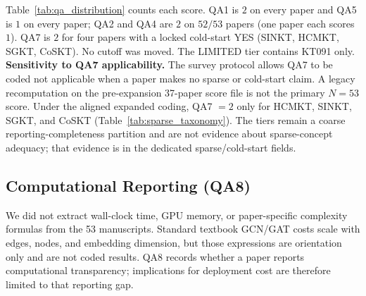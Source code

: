 \documentclass[lettersize,journal]{IEEEtran}
\begin{document}
Table~\ref{tab:qa_distribution} counts each score. QA1 is $2$ on every paper and QA5 is $1$ on every paper; QA2 and QA4 are $2$ on $52/53$ papers (one paper each scores $1$). QA7 is $2$ for four papers with a locked cold-start YES (SINKT, HCMKT, SGKT, CoSKT). No cutoff was moved. The LIMITED tier contains KT091 only.
\textbf{Sensitivity to QA7 applicability.} The survey protocol allows QA7 to be coded not applicable when a paper makes no sparse or cold-start claim. A legacy recomputation on the pre-expansion 37-paper score file is not the primary $N=53$ score. Under the aligned expanded coding, QA7 $=2$ only for HCMKT, SINKT, SGKT, and CoSKT (Table~\ref{tab:sparse_taxonomy}). The tiers remain a coarse reporting-completeness partition and are not evidence about sparse-concept adequacy; that evidence is in the dedicated sparse/cold-start fields.

\subsection{Computational Reporting (QA8)}
We did not extract wall-clock time, GPU memory, or paper-specific complexity formulas from the 53 manuscripts. Standard textbook GCN/GAT costs scale with edges, nodes, and embedding dimension, but those expressions are orientation only and are not coded results. QA8 records whether a paper reports computational transparency; implications for deployment cost are therefore limited to that reporting gap.
\end{document}
